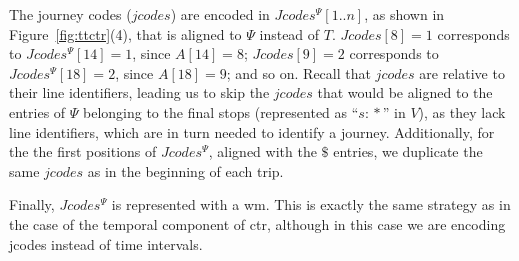     The journey codes ($jcodes$) are encoded in $Jcodes^{\Psi}[1..n]$, as shown in Figure~\ref{fig:ttctr}(4), that is aligned to $\Psi$ instead of $T$. $Jcodes[8]= 1$ corresponds to $Jcodes^{\Psi}[14]=1$, since $A[14]=8$; $Jcodes[9]= 2$ corresponds to $Jcodes^{\Psi}[18]=2$, since $A[18]=9$; and so on. Recall that $jcodes$ are relative to their line identifiers, leading us to skip the $jcodes$ that would be aligned to the entries of $\Psi$ belonging to the final stops (represented as ``$s\!:\!*$'' in $V$), as they lack line identifiers, which are in turn needed to identify a journey. Additionally, for the the first positions of $Jcodes^{\Psi}$, aligned with the $\$$ entries, we duplicate the same $jcodes$ as in the beginning of each trip.
	
    Finally, $Jcodes^{\Psi}$ is represented with a \gls{wm}. This is exactly the same strategy as in the case of the temporal component of \gls{ctr}, although in this case we are encoding jcodes instead of time intervals.
    
